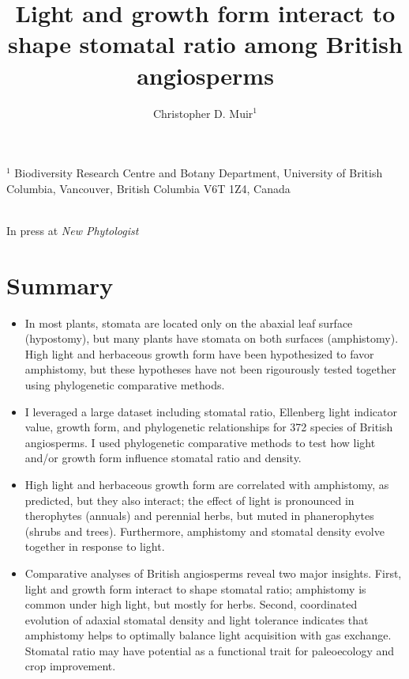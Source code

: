 \documentclass[12pt, oneside]{article}
\begin{document}


\title{Light and growth form interact to shape stomatal ratio among British angiosperms}
\author{Christopher D. Muir$^1$}
\date{} %

\maketitle

$^1$ Biodiversity Research Centre and Botany Department, University of British Columbia, Vancouver, British Columbia V6T 1Z4, Canada \\
\\
\begin{center}
In press at \textit{New Phytologist} \\
\end{center}
\clearpage


\section*{Summary}

\begin{itemize}

	\item In most plants, stomata are located only on the abaxial leaf surface (hypostomy), but many plants have stomata on both surfaces (amphistomy). High light and herbaceous growth form have been hypothesized to favor amphistomy, but these hypotheses have not been rigourously tested together using phylogenetic comparative methods.
	
	\item I leveraged a large dataset including stomatal ratio, Ellenberg light indicator value, growth form, and phylogenetic relationships for 372 species of British angiosperms. I used phylogenetic comparative methods to test how light and/or growth form influence stomatal ratio and density.
	
	\item High light and herbaceous growth form are correlated with amphistomy, as predicted, but they also interact; the effect of light is pronounced in therophytes (annuals) and perennial herbs, but muted in phanerophytes (shrubs and trees). Furthermore, amphistomy and stomatal density evolve together in response to light.
	
	\item Comparative analyses of British angiosperms reveal two major insights. First, light and growth form interact to shape stomatal ratio; amphistomy is common under high light, but mostly for herbs. Second, coordinated evolution of adaxial stomatal density and light tolerance indicates that amphistomy helps to optimally balance light acquisition with gas exchange. Stomatal ratio may have potential as a functional trait for paleoecology and crop improvement.
	
\end{itemize}
\end{document}
